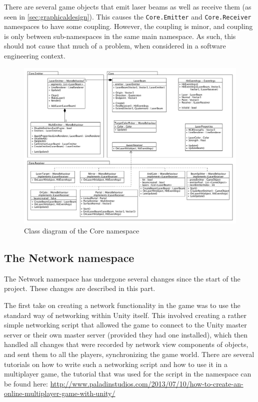 			There are several game objects that emit laser beams as well as 
			receive them (as seen in \ref{sec:graphicaldesign}). This causes the
			\texttt{Core.Emitter} and \texttt{Core.Receiver} namespaces to have 
			some coupling. However, the coupling is minor, and coupling is only 
			between sub-namespaces in the same main namespace. As such, this 
			should not cause that much of a problem, when considered in a 
			software engineering context.
			
			\begin{figure}[ht]
				\includegraphics[width=\textwidth]{ClassDiagramCore}
				\caption{Class diagram of the Core namespace}
				\label{fig:classdiagramcore}
			\end{figure}
			
		\subsection{The Network namespace} \label{ssec:networknamespace}
			The Network namespace has undergone several changes since the start
			of the project. These changes are described in this part.
			
			The first take on creating a network functionality in the game
			was to use the standard way of networking within Unity itself.
			This involved creating a rather simple networking script that
			allowed the game to connect to the Unity master server or their own
			master server (provided they had one installed), which then handled
			all changes that were recorded by network view components of objects,
			and sent them to all the players, synchronizing the game world.
			There are several tutorials on how to write such a networking
			script and how to use it in a multiplayer game, the tutorial that
			was used for the script in the namespace can be found here:
			\url{http://www.paladinstudios.com/2013/07/10/how-to-create-an-online-multiplayer-game-with-unity/}
			
